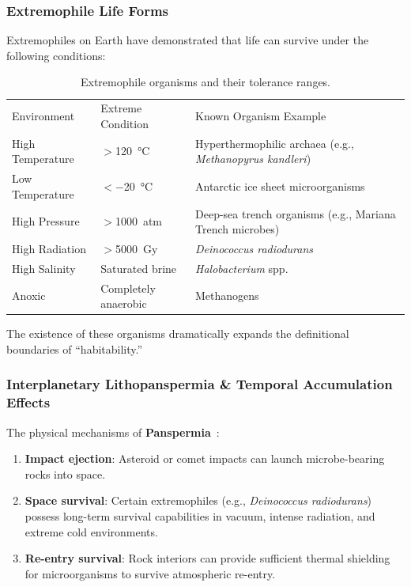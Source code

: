 \documentclass[aps,prd,twocolumn,superscriptaddress,nofootinbib]{revtex4-2}
\begin{document}
\subsubsection{Extremophile Life Forms}\label{sec:extremophiles}

Extremophiles on Earth have demonstrated that life can survive under the following conditions:

\begin{table}[htbp]
\caption{Extremophile organisms and their tolerance ranges.}
\label{tab:extremophiles}
\begin{ruledtabular}
\begin{tabular}{lll}
Environment & Extreme Condition & Known Organism Example \\
\colrule
High Temperature & $>$\SI{120}{\degreeCelsius} & Hyperthermophilic archaea (e.g., \textit{Methanopyrus kandleri})~\cite{Takai2008} \\
Low Temperature & $<$\SI{-20}{\degreeCelsius} & Antarctic ice sheet microorganisms \\
High Pressure & $>$\SI{1000}{atm} & Deep-sea trench organisms (e.g., Mariana Trench microbes) \\
High Radiation & $>$\SI{5000}{Gy} & \textit{Deinococcus radiodurans}~\cite{Slade2011} \\
High Salinity & Saturated brine & \textit{Halobacterium} spp. \\
Anoxic & Completely anaerobic & Methanogens \\
\end{tabular}
\end{ruledtabular}
\end{table}

The existence of these organisms dramatically expands the definitional boundaries of ``habitability.''

\subsubsection{Interplanetary Lithopanspermia \& Temporal Accumulation Effects}\label{sec:panspermia}

The physical mechanisms of \textbf{Panspermia}~\cite{Worth2013}:

\begin{enumerate}
  \item \textbf{Impact ejection}: Asteroid or comet impacts can launch microbe-bearing rocks into space.
  \item \textbf{Space survival}: Certain extremophiles (e.g., \textit{Deinococcus radiodurans}) possess long-term survival capabilities in vacuum, intense radiation, and extreme cold environments.
  \item \textbf{Re-entry survival}: Rock interiors can provide sufficient thermal shielding for microorganisms to survive atmospheric re-entry.
\end{enumerate}
\end{document}

